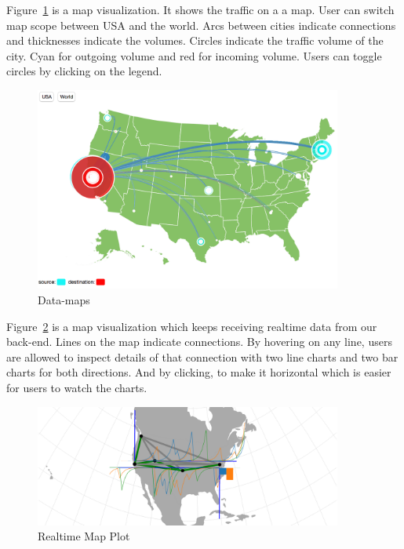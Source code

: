 \documentclass[paper=a4, fontsize=11pt]{report} %
\begin{document}
\begin{description}[style=nextline]
    \item[\href{http://sjengle.cs.usfca.edu/cs690-sonicwall/wsheng/datamaps/}{Datamaps}]
    Figure~\ref{fig:datamaps} is a map visualization. It shows the traffic on a a map.
    User can switch map scope between USA and the world.
    Arcs between cities indicate connections and thicknesses indicate the volumes.
    Circles indicate the traffic volume of the city. Cyan for outgoing volume and red for incoming volume.
    Users can toggle circles by clicking on the legend.
    \begin{figure}[H]
        \begin{center}
            \includegraphics[width=0.9\textwidth]{datamap.png}
        \end{center}
        \caption{Data-maps}\label{fig:datamaps}
    \end{figure}

    \item[\href{http://sjengle.cs.usfca.edu/cs690-sonicwall/kyang/week-1_map_plot_refined/}{Realtime Map Plot}]
    Figure~\ref{fig:realtime} is a map visualization which keeps receiving realtime data from our back-end.
    Lines on the map indicate connections.
    By hovering on any line, users are allowed to inspect details of that connection with two line charts and two bar charts for both directions.
    And by clicking, to make it horizontal which is easier for users to watch the charts.
    \begin{figure}[H]
        \begin{center}
            \includegraphics[width=0.9\textwidth]{realtime.png}
        \end{center}
        \caption{Realtime Map Plot}\label{fig:realtime}
    \end{figure}

\end{description}
\end{document}
